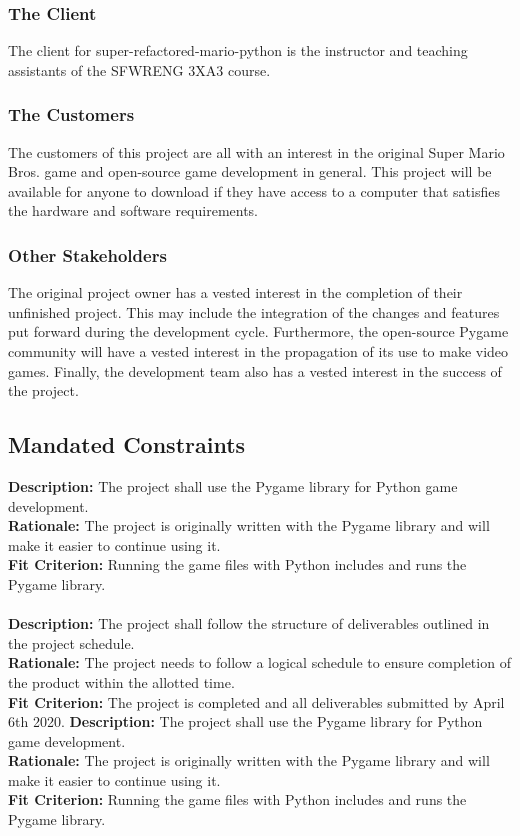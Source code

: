 \documentclass[12pt, titlepage]{article}
\begin{document}
\subsubsection{The Client}
    The client for super-refactored-mario-python is the instructor and teaching assistants of the SFWRENG 3XA3 course.
\subsubsection{The Customers}
    The customers of this project are all with an interest in the original Super Mario Bros. game and open-source game development in general. This project will be available for anyone to download if they have access to a computer that satisfies the hardware and software requirements.
\subsubsection{Other Stakeholders}
    The original project owner has a vested interest in the completion of their unfinished project. This may include the integration of the changes and features put forward during the development cycle. Furthermore, the open-source Pygame community will have a vested interest in the propagation of its use to make video games. Finally, the development team also has a vested interest in the success of the project.
\subsection{Mandated Constraints}
    \textbf{Description:} The project shall use the Pygame library for Python game development.\\
    \textbf{Rationale:} The project is originally written with the Pygame library and will make it easier to continue using it.\\
    \textbf{Fit Criterion:} Running the game files with Python includes and runs the Pygame library.\\\\
    \textbf{Description:} The project shall follow the structure of deliverables outlined in the project schedule.\\
    \textbf{Rationale:} The project needs to follow a logical schedule to ensure completion of the product within the allotted time.\\
    \textbf{Fit Criterion:} The project is completed and all deliverables submitted by April 6th 2020.
    \textbf{Description:} The project shall use the Pygame library for Python game development.\\
    \textbf{Rationale:} The project is originally written with the Pygame library and will make it easier to continue using it.\\
    \textbf{Fit Criterion:} Running the game files with Python includes and runs the Pygame library.\\\\
\end{document}
